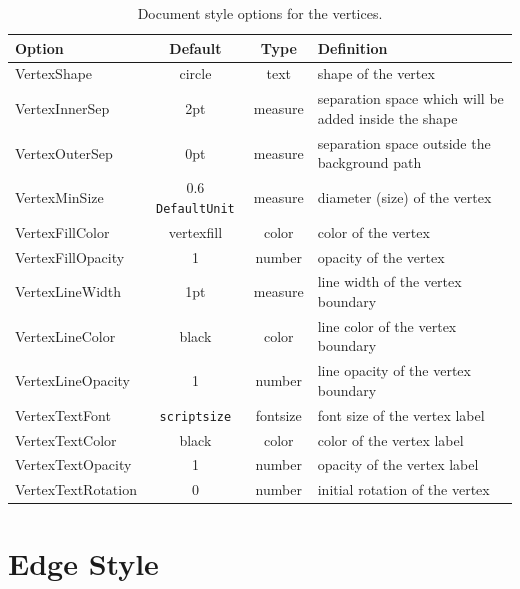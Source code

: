 \documentclass[a4paper,twosided,notoc]{tufte-book}
\makeatletter
\newcommand{\hangleft}[1]{\makebox[0pt][r]{#1}}
\newcommand{\tuftebs}{\symbol{'134}}%
\newcommand{\doccmd}[2][]{%
  \texttt{\tuftebs#2}%
  \ifthenelse{\isempty{#1}}%
    {%
      \index{#2 command@\protect\hangleft{\texttt{\tuftebs}}\texttt{#2}}%
    }%
    {%
      \index{#2 command@\protect\hangleft{\texttt{\tuftebs}}\texttt{#2} (\texttt{#1} package)}%
      \index{#1 package@\texttt{#1} package}\index{packages!#1@\texttt{#1}}%
    }%
}%
\makeatother
\begin{document}
\begin{table}[h]
  \footnotesize%
  \begin{center}
    \begin{tabularx}{\textwidth}{lccX}
      \toprule
      Option & Default & Type &Definition \\
      \midrule
VertexShape        & circle                  & text     & shape of the vertex \\
VertexInnerSep     & 2pt                     & measure  & separation space which will be added inside the shape \\
VertexOuterSep     & 0pt                     & measure  & separation space outside the background path \\
VertexMinSize      & 0.6\doccmd{DefaultUnit} & measure  & diameter (size) of the vertex \\
VertexFillColor    & vertexfill              & color    & color of the vertex \\
VertexFillOpacity  & 1                       & number   & opacity of the vertex \\
VertexLineWidth    & 1pt                     & measure  & line width of the vertex boundary \\
VertexLineColor    & black                   & color    & line color of the vertex boundary \\
VertexLineOpacity  & 1                       & number   & line opacity of the vertex boundary \\
VertexTextFont     & \doccmd{scriptsize}     & fontsize & font size of the vertex label \\
VertexTextColor    & black                   & color    & color of the vertex label \\
VertexTextOpacity  & 1                       & number   & opacity of the vertex label \\
VertexTextRotation & 0                       & number   & initial rotation of the vertex \\
      \bottomrule
    \end{tabularx}
    \scriptsize
  \end{center}
  \caption{Document style options for the vertices.}
  \label{tab:vertex_style}
\end{table}


\section{Edge Style}
\label{sec:edge_style}
\end{document}

